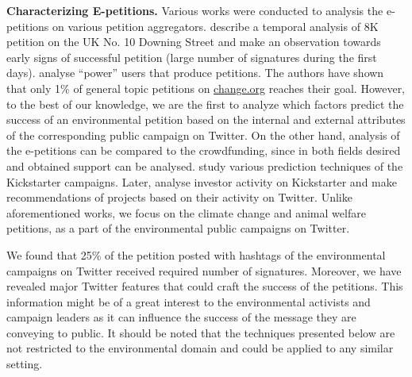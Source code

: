 \textbf{Characterizing E-petitions.} Various works were conducted to analysis the e-petitions on various petition aggregators.
\cite{Hale2013} describe a temporal analysis of 8K petition on the UK No. 10 Downing Street and make an observation towards early signs of successful petition (large number of signatures during the first days).
\cite{Huang2015} analyse ``power'' users that produce petitions. The authors have shown that only 1\% of general topic petitions on \url{change.org} reaches their goal.
However, to the best of our knowledge, we are the first to analyze which factors predict the success of an environmental petition based on the internal and external attributes of the corresponding public campaign on Twitter.
On the other hand, analysis of the e-petitions can be compared to the crowdfunding, since in both fields desired and obtained support can be analysed. \cite{Etter2013} study various prediction techniques of the Kickstarter campaigns.
Later, \cite{An2014} analyse investor activity on Kickstarter and make recommendations of projects based on their activity on Twitter. Unlike aforementioned works, we focus on the climate change and animal welfare petitions, as a part of the environmental public campaigns on Twitter.


We found that 25\% of the petition posted with hashtags of the environmental campaigns on Twitter received required number of signatures.
Moreover, we have revealed major Twitter features that could craft the success of the petitions.
This information might be of a great interest to the environmental activists and campaign leaders as it can influence the success of the message they are conveying to public.
It should be noted that the techniques presented below are not restricted to the environmental domain and could be applied to any similar setting.

